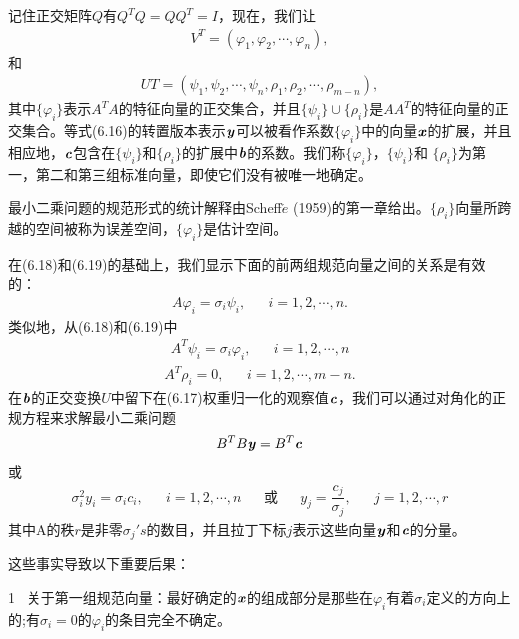 记住正交矩阵$Q$有$ Q^{T}Q=QQ^{T}=I$，现在，我们让
\begin{align}
V^{T}=(\varphi_{1},\varphi_{2},\cdots,\varphi_{n}),
\end{align}
和
\begin{align}
UT=(\psi_{1},\psi_{2},\cdots,\psi_{n},\rho_{1},\rho_{2},\cdots,\rho_{m-n}),
\end{align}
其中$ \{ \varphi_{i} \}  $表示$ A^{T}A $的特征向量的正交集合，并且$ \{\psi_{i}\}\cup\{\rho_{i}\}$是$AA^{T}$的特征向量的正交集合。等式(6.16)的转置版本表示$\textbf{\textit{y}}$可以被看作系数$\{\varphi_{i}\}$中的向量$\textbf{\textit{x}}$的扩展，并且相应地，$\textbf{\textit{c}}$包含在$ \{\psi_{i}\} $和$ \{\rho_{i}\} $的扩展中$\textbf{\textit{b}}$的系数。我们称$ \{\varphi_{i}\} $，$ \{\psi_{i}\} $和 $ \{\rho_{i}\} $为第一，第二和第三组标准向量，即使它们没有被唯一地确定。

最小二乘问题的规范形式的统计解释由Scheff$\acute{e}$ (1959)的第一章给出。$ \{\rho_{i}\} $向量所跨越的空间被称为误差空间，$ \{\varphi_{i}\} $是估计空间。

在(6.18)和(6.19)的基础上，我们显示下面的前两组规范向量之间的关系是有效的：
\begin{align}
A\varphi_{i}=\sigma_{i}\psi_{i}, & &  i=1,2,\cdots,n.
\end{align}
类似地，从(6.18)和(6.19)中
\begin{align}
A^{T}\psi_{i}=\sigma_{i}\varphi_{i}, & &  i=1,2,\cdots,n
\end{align}
\begin{align}
A^{T}\rho_{i}=0, & &  i=1,2,\cdots,m-n.
\end{align}
在$\textbf{\textit{b}}$的正交变换$U$中留下在(6.17)权重归一化的观察值$\textbf{\textit{c}}$，我们可以通过对角化的正规方程来求解最小二乘问题
\begin{align}
B^{T}B\textbf{\textit{y}}=B^{T}\textbf{\textit{c}}
\end{align}
或
\begin{align*}
\sigma^{2}_{i}y_{i}=\sigma_{i}c_{i}, & & i=1,2,\cdots,n  &  & \text{或}&  & y_{j}=\dfrac{c_{j}}{\sigma_{j}},& & j=1,2,\cdots,r
\end{align*}
其中A的秩$r$是非零$ \sigma_{j}'s $的数目，并且拉丁下标$j$表示这些向量$\textbf{\textit{y}}$和$\textbf{\textit{c}}$的分量。

 这些事实导致以下重要后果：

1 \ 关于第一组规范向量：最好确定的$\textbf{\textit{x}}$的组成部分是那些在$ \varphi_{i} $有着$ \sigma_{i} $定义的方向上的;有$ \sigma_{i}=0 $的$ \varphi_{i} $的条目完全不确定。


